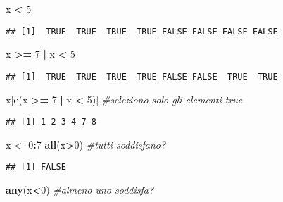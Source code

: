 \documentclass[
]{article}
\newenvironment{Shaded}{\begin{snugshade}}{\end{snugshade}}
\newcommand{\CommentTok}[1]{\textcolor[rgb]{0.56,0.35,0.01}{\textit{#1}}}
\newcommand{\DecValTok}[1]{\textcolor[rgb]{0.00,0.00,0.81}{#1}}
\newcommand{\FunctionTok}[1]{\textcolor[rgb]{0.13,0.29,0.53}{\textbf{#1}}}
\newcommand{\NormalTok}[1]{#1}
\newcommand{\OtherTok}[1]{\textcolor[rgb]{0.56,0.35,0.01}{#1}}
\newcommand{\SpecialCharTok}[1]{\textcolor[rgb]{0.81,0.36,0.00}{\textbf{#1}}}
\begin{document}
\begin{Shaded}
\begin{Highlighting}[]
\NormalTok{x }\SpecialCharTok{\textless{}} \DecValTok{5}
\end{Highlighting}
\end{Shaded}

\begin{verbatim}
## [1]  TRUE  TRUE  TRUE  TRUE FALSE FALSE FALSE FALSE
\end{verbatim}

\begin{Shaded}
\begin{Highlighting}[]
\NormalTok{x }\SpecialCharTok{\textgreater{}=} \DecValTok{7} \SpecialCharTok{|}\NormalTok{ x }\SpecialCharTok{\textless{}} \DecValTok{5}
\end{Highlighting}
\end{Shaded}

\begin{verbatim}
## [1]  TRUE  TRUE  TRUE  TRUE FALSE FALSE  TRUE  TRUE
\end{verbatim}

\begin{Shaded}
\begin{Highlighting}[]
\NormalTok{x[}\FunctionTok{c}\NormalTok{(x }\SpecialCharTok{\textgreater{}=} \DecValTok{7} \SpecialCharTok{|}\NormalTok{ x }\SpecialCharTok{\textless{}} \DecValTok{5}\NormalTok{)] }\CommentTok{\#seleziono solo gli elementi true}
\end{Highlighting}
\end{Shaded}

\begin{verbatim}
## [1] 1 2 3 4 7 8
\end{verbatim}

\begin{Shaded}
\begin{Highlighting}[]
\NormalTok{x }\OtherTok{\textless{}{-}} \DecValTok{0}\SpecialCharTok{:}\DecValTok{7}
\FunctionTok{all}\NormalTok{(x}\SpecialCharTok{\textgreater{}}\DecValTok{0}\NormalTok{) }\CommentTok{\#tutti soddisfano?}
\end{Highlighting}
\end{Shaded}

\begin{verbatim}
## [1] FALSE
\end{verbatim}

\begin{Shaded}
\begin{Highlighting}[]
\FunctionTok{any}\NormalTok{(x}\SpecialCharTok{\textless{}}\DecValTok{0}\NormalTok{) }\CommentTok{\#almeno uno soddisfa?}
\end{Highlighting}
\end{Shaded}
\end{document}
